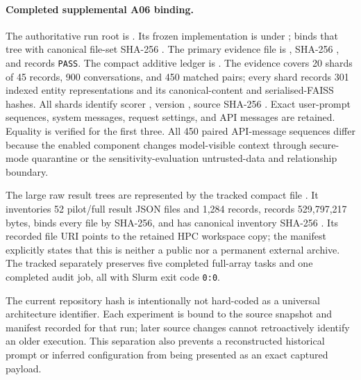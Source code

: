 \paragraph{Completed supplemental A06 binding.}
The authoritative run root is . Its frozen implementation is under ;  binds that tree with canonical file-set SHA-256 . The primary evidence file is , SHA-256 , and  records \texttt{PASS}. The compact additive ledger is . The evidence covers 20 shards of 45 records, 900 conversations, and 450 matched pairs; every shard records 301 indexed entity representations and its canonical-content and serialised-FAISS hashes. All shards identify scorer , version , source SHA-256 . Exact user-prompt sequences, system messages, request settings, and API messages are retained. Equality is verified for the first three. All 450 paired API-message sequences differ because the enabled component changes model-visible context through secure-mode quarantine or the sensitivity-evaluation untrusted-data and relationship boundary.

The large raw result trees are represented by the tracked compact file . It inventories 52 pilot/full result JSON files and 1,284 records, records 529,797,217 bytes, binds every file by SHA-256, and has canonical inventory SHA-256 . Its recorded file URI points to the retained HPC workspace copy; the manifest explicitly states that this is neither a public nor a permanent external archive. The tracked  separately preserves five completed full-array tasks and one completed audit job, all with Slurm exit code \texttt{0:0}.

The current repository hash is intentionally not hard-coded as a universal architecture identifier. Each experiment is bound to the source snapshot and manifest recorded for that run; later source changes cannot retroactively identify an older execution. This separation also prevents a reconstructed historical prompt or inferred configuration from being presented as an exact captured payload.

\FloatBarrier

